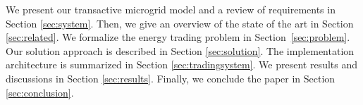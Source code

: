 



  We present our transactive microgrid model and a review of requirements in Section \ref{sec:system}.
Then, we give an overview of the state of the art in Section \ref{sec:related}.
We formalize the energy trading problem in Section~\ref{sec:problem}.
Our solution approach is described in Section \ref{sec:solution}. The implementation architecture is summarized in Section \ref{sec:tradingsystem}. We present results and discussions in Section \ref{sec:results}. Finally, we conclude the paper in Section \ref{sec:conclusion}.


